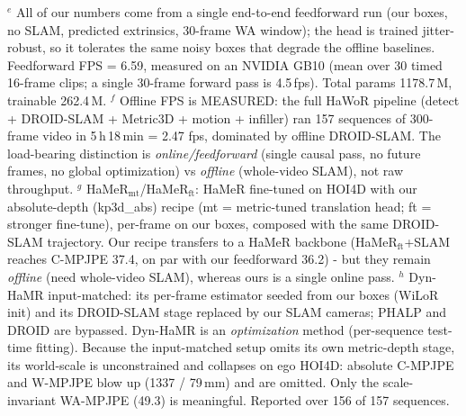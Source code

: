 \documentclass[border=5pt]{standalone}
\begin{document}
\begin{minipage}{17.4cm}
\begin{minipage}{17.0cm}
$^{e}$ All of our numbers come from a single end-to-end feedforward run (our boxes, no SLAM, predicted
extrinsics, 30-frame WA window); the head is trained jitter-robust, so it tolerates the same noisy
boxes that degrade the offline baselines. Feedforward FPS = 6.59, measured on an NVIDIA GB10 (mean over
30 timed 16-frame clips; a single 30-frame forward pass is 4.5\,fps). Total params 1178.7\,M, trainable
262.4\,M.
$^{f}$ Offline FPS is MEASURED: the full HaWoR pipeline (detect + DROID-SLAM + Metric3D + motion +
infiller) ran 157 sequences of 300-frame video in 5\,h\,18\,min = 2.47 fps, dominated by offline
DROID-SLAM. The load-bearing distinction is \emph{online/feedforward} (single causal pass, no future
frames, no global optimization) vs \emph{offline} (whole-video SLAM), not raw throughput.
$^{g}$ HaMeR$_{\text{mt}}$/HaMeR$_{\text{ft}}$: HaMeR fine-tuned on HOI4D with our absolute-depth
(kp3d\_abs) recipe (mt = metric-tuned translation head; ft = stronger fine-tune), per-frame on our
boxes, composed with the same DROID-SLAM trajectory. Our recipe transfers to a HaMeR backbone
(HaMeR$_{\text{ft}}$+SLAM reaches C-MPJPE 37.4, on par with our feedforward 36.2) - but they remain
\emph{offline} (need whole-video SLAM), whereas ours is a single online pass.
$^{h}$ Dyn-HaMR input-matched: its per-frame estimator seeded from our boxes (WiLoR init) and its
DROID-SLAM stage replaced by our SLAM cameras; PHALP and DROID are bypassed. Dyn-HaMR is an
\emph{optimization} method (per-sequence test-time fitting). Because the input-matched setup omits its
own metric-depth stage, its world-scale is unconstrained and collapses on ego HOI4D: absolute C-MPJPE
and W-MPJPE blow up (1337 / 79\,mm) and are omitted. Only the scale-invariant WA-MPJPE (49.3) is
meaningful. Reported over 156 of 157 sequences.
\end{minipage}
\end{minipage}
\end{document}
